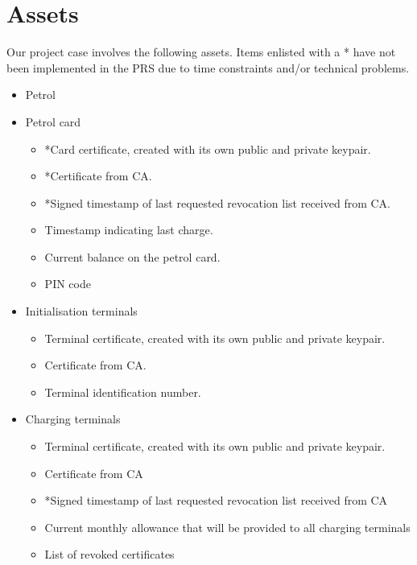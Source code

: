 \section{Assets}
Our project case involves the following assets. Items enlisted with a * have not been implemented in the PRS due to time constraints and/or technical problems.
\begin{itemize}
\item Petrol

\item Petrol card
\begin{itemize}
 \item *Card certificate, created with its own public and private keypair.
 \item *Certificate from CA.
 \item *Signed timestamp of last requested revocation list received from CA.
 \item Timestamp indicating last charge.
 \item Current balance on the petrol card.
 \item PIN code
\end{itemize}

 \item Initialisation terminals
 \begin{itemize}
 \item Terminal certificate, created with its own public and private keypair.
 \item Certificate from CA.
 \item Terminal identification number.
 \end{itemize}
 
 \item Charging terminals
 \begin{itemize}
    \item Terminal certificate, created with its own public and private keypair.
   	\item Certificate from CA
   	\item *Signed timestamp of last requested revocation list received from CA
 	\item Current monthly allowance that will be provided to all charging terminals
	\item List of revoked certificates
 \end{itemize}


\end{itemize}
